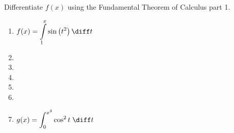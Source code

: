 Differentiate $f(x)$ using the Fundamental Theorem of Calculus part 1.
\begin{multicols}{2}
\begin{enumerate}[ref={\fcProblemRef}]
\item $\displaystyle f(x) = \int\limits_1^x \sin \left(t^2\right)  \diff t$

\item 
\item 
\item 
\item 
\item 
\item ${\displaystyle g(x) = \int_{0}^{x^3} \cos^2 t \; \diff t}$


\end{enumerate}
\end{multicols}